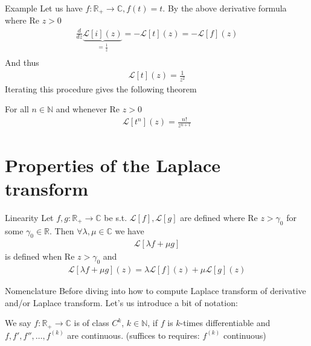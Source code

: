 
\begin{parag}{Example}
    Let us have $f : \mathbb{R}_+ \to \mathbb{C}, f\left(t\right) = t$. By the above derivative formula where $\text{Re }z > 0$
	\begin{align*} 
		\frac{d}{dz} \underbrace{\mathcal{L}\left[i\right]\left(z\right)}_{= \frac{1}{z}} =  -\mathcal{L}\left[t\right]\left(z\right) =  - \mathcal{L}\left[f\right]\left(z\right)\\
	\end{align*}
	And thus 
	\begin{align*} 
		\mathcal{L}\left[t\right]\left(z\right) = \frac{1}{z^2}
	\end{align*}
	Iterating this procedure gives the following theorem
	\begin{theoreme}
	    For all $n \in \mathbb{N}$ and whenever $\text{Re }z > 0$
		\begin{align*} 
			\mathcal{L}\left[t^n\right]\left(z\right) = \frac{n!}{z^{n+1}}
		\end{align*}
	\end{theoreme}
\end{parag}

\section{Properties of the Laplace transform}

\begin{parag}{Linearity}
    Let $f, g: \mathbb{R}_+ \to \mathbb{C}$ be s.t. $\mathcal{L}\left[f\right], \mathcal{L}\left[g\right]$ are defined where $\text{Re }z > \gamma_0$ for some $\gamma_0 \in \mathbb{R}$. Then $\forall \lambda, \mu \in \mathbb{C}$ we have 
	\begin{align*} 
		\mathcal{L}\left[\lambda f + \mu g\right] 
	\end{align*}
	is defined when $\text{Re }z > \gamma_0$ and 
	\begin{align*} 
		\mathcal{L}\left[\lambda f + \mu g\right]\left(z\right) = \lambda \mathcal{L}\left[f\right]\left(z\right) + \mu \mathcal{L}\left[g\right]\left(z\right)
	\end{align*}
\end{parag}


\begin{parag}{Nomenclature}
	Before diving into how to compute Laplace transform of derivative and/or Laplace transform. Let's us introduce a bit of notation:
    \begin{definition}
    We say $f: \mathbb{R}_+ \to \mathbb{C}$ is of class $C^{k}$, $k \in \mathbb{N}$, if $f$ is $k$-times differentiable and $f, f', f'', \ldots, f^{\left(k\right)}$ are continuous. (suffices to requires: $f^{\left(k\right)}$ continuous)
    \end{definition}
\end{parag}

